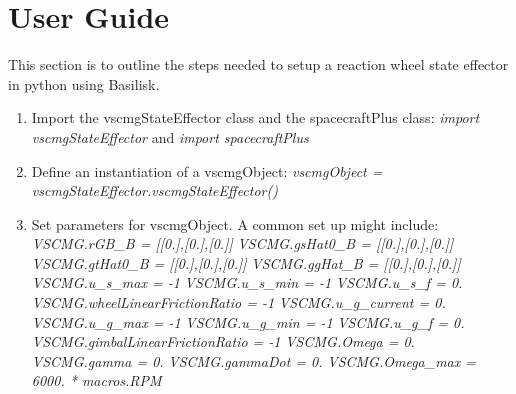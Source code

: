 \section{User Guide}

This section is to outline the steps needed to setup a reaction wheel state effector in python using Basilisk.

\begin{enumerate}
	\item Import the vscmgStateEffector class and the spacecraftPlus class: \newline \textit{import vscmgStateEffector} and \textit{import spacecraftPlus}
	\item Define an instantiation of a vscmgObject: \newline
	\textit{vscmgObject = vscmgStateEffector.vscmgStateEffector()}
	\item Set parameters for vscmgObject. A common set up might include: \newline
		\textit{VSCMG.rGB\_B = [[0.],[0.],[0.]]} \newline
         \textit{VSCMG.gsHat0\_B = [[0.],[0.],[0.]]} \newline
         \textit{VSCMG.gtHat0\_B = [[0.],[0.],[0.]]} \newline
         \textit{VSCMG.ggHat\_B = [[0.],[0.],[0.]]} \newline
         \textit{VSCMG.u\_s\_max = -1} \newline
         \textit{VSCMG.u\_s\_min = -1} \newline
         \textit{VSCMG.u\_s\_f = 0.} \newline
         \textit{VSCMG.wheelLinearFrictionRatio = -1} \newline
         \textit{VSCMG.u\_g\_current = 0.} \newline
         \textit{VSCMG.u\_g\_max = -1} \newline
         \textit{VSCMG.u\_g\_min = -1} \newline
         \textit{VSCMG.u\_g\_f = 0.} \newline
         \textit{VSCMG.gimbalLinearFrictionRatio = -1} \newline
         \textit{VSCMG.Omega = 0.} \newline
         \textit{VSCMG.gamma = 0.} \newline
         \textit{VSCMG.gammaDot = 0.} \newline
         \textit{VSCMG.Omega\_max = 6000. * macros.RPM} \newline

\end{enumerate}
